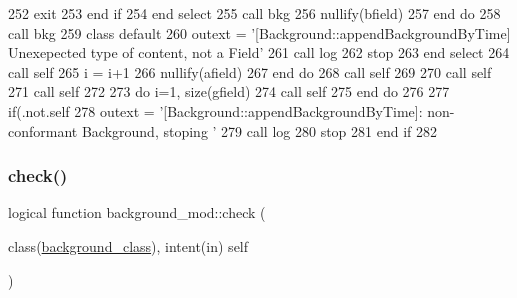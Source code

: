 \begin{DoxyCode}
252                         \textcolor{keywordflow}{exit}
253 \textcolor{keywordflow}{                    end if}
254 \textcolor{keywordflow}{                end select}
255                 \textcolor{keyword}{call }bkg%
256                 \textcolor{keyword}{nullify}(bfield)
257 \textcolor{keywordflow}{            end do}
258             \textcolor{keyword}{call }bkg%
259 \textcolor{keywordflow}{            class default}
260             outext = \textcolor{stringliteral}{'[Background::appendBackgroundByTime] Unexepected type of content, not a Field'}
261             \textcolor{keyword}{call }log%
262             stop
263 \textcolor{keywordflow}{        end select}
264         \textcolor{keyword}{call }self%
265         i = i+1
266         \textcolor{keyword}{nullify}(afield)
267 \textcolor{keywordflow}{    end do}
268     \textcolor{keyword}{call }self%
269 
270     \textcolor{keyword}{call }self%
271     \textcolor{keyword}{call }self%
272 
273     \textcolor{keywordflow}{do} i=1, \textcolor{keyword}{size}(gfield)
274         \textcolor{keyword}{call }self%
275 \textcolor{keywordflow}{    end do}
276 
277     \textcolor{keywordflow}{if}(.not.self%
278         outext = \textcolor{stringliteral}{'[Background::appendBackgroundByTime]: non-conformant Background, stoping '}
279         \textcolor{keyword}{call }log%
280         stop
281 \textcolor{keywordflow}{    end if}
282 
\end{DoxyCode}
\mbox{\label{namespacebackground__mod_af2f517e4aa946491744e012153045bd4}} 
\subsubsection{\texorpdfstring{check()}{check()}}
{\footnotesize\ttfamily logical function background\+\_\+mod\+::check (\begin{DoxyParamCaption}\item[{class(\mbox{\hyperlink{structbackground__mod_1_1background__class}{background\+\_\+class}}), intent(in)}]{self }\end{DoxyParamCaption})\hspace{0.3cm}{\ttfamily [private]}}



